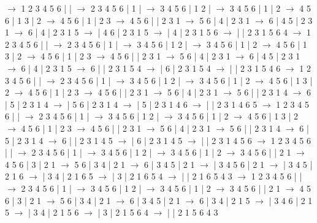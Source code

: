 \documentclass{article}
\begin{document}
\newline
 $\rightarrow$ 1 2 3 4 5 6 |  |  $\rightarrow$ 2 3 4 5 6 | 1 |  $\rightarrow$ 3 4 5 6 | 1 2 |  $\rightarrow$ 3 4 5 6 | 1 | 2 $\rightarrow$ 4 5 6 | 1 3 | 2 $\rightarrow$ 4 5 6 | 1 | 2 3 $\rightarrow$ 4 5 6 |  | 2 3 1 $\rightarrow$ 5 6 | 4 | 2 3 1 $\rightarrow$ 6 | 4 5 | 2 3 1 $\rightarrow$ 6 | 4 | 2 3 1 5 $\rightarrow$  | 4 6 | 2 3 1 5 $\rightarrow$  | 4 | 2 3 1 5 6 $\rightarrow$  |  | 2 3 1 5 6 4
\newline
 $\rightarrow$ 1 2 3 4 5 6 |  |  $\rightarrow$ 2 3 4 5 6 | 1 |  $\rightarrow$ 3 4 5 6 | 1 2 |  $\rightarrow$ 3 4 5 6 | 1 | 2 $\rightarrow$ 4 5 6 | 1 3 | 2 $\rightarrow$ 4 5 6 | 1 | 2 3 $\rightarrow$ 4 5 6 |  | 2 3 1 $\rightarrow$ 5 6 | 4 | 2 3 1 $\rightarrow$ 6 | 4 5 | 2 3 1 $\rightarrow$ 6 | 4 | 2 3 1 5 $\rightarrow$ 6 |  | 2 3 1 5 4 $\rightarrow$  | 6 | 2 3 1 5 4 $\rightarrow$  |  | 2 3 1 5 4 6
\newline
 $\rightarrow$ 1 2 3 4 5 6 |  |  $\rightarrow$ 2 3 4 5 6 | 1 |  $\rightarrow$ 3 4 5 6 | 1 2 |  $\rightarrow$ 3 4 5 6 | 1 | 2 $\rightarrow$ 4 5 6 | 1 3 | 2 $\rightarrow$ 4 5 6 | 1 | 2 3 $\rightarrow$ 4 5 6 |  | 2 3 1 $\rightarrow$ 5 6 | 4 | 2 3 1 $\rightarrow$ 5 6 |  | 2 3 1 4 $\rightarrow$ 6 | 5 | 2 3 1 4 $\rightarrow$  | 5 6 | 2 3 1 4 $\rightarrow$  | 5 | 2 3 1 4 6 $\rightarrow$  |  | 2 3 1 4 6 5
\newline
 $\rightarrow$ 1 2 3 4 5 6 |  |  $\rightarrow$ 2 3 4 5 6 | 1 |  $\rightarrow$ 3 4 5 6 | 1 2 |  $\rightarrow$ 3 4 5 6 | 1 | 2 $\rightarrow$ 4 5 6 | 1 3 | 2 $\rightarrow$ 4 5 6 | 1 | 2 3 $\rightarrow$ 4 5 6 |  | 2 3 1 $\rightarrow$ 5 6 | 4 | 2 3 1 $\rightarrow$ 5 6 |  | 2 3 1 4 $\rightarrow$ 6 | 5 | 2 3 1 4 $\rightarrow$ 6 |  | 2 3 1 4 5 $\rightarrow$  | 6 | 2 3 1 4 5 $\rightarrow$  |  | 2 3 1 4 5 6
\newline
 $\rightarrow$ 1 2 3 4 5 6 |  |  $\rightarrow$ 2 3 4 5 6 | 1 |  $\rightarrow$ 3 4 5 6 | 1 2 |  $\rightarrow$ 3 4 5 6 | 1 | 2 $\rightarrow$ 3 4 5 6 |  | 2 1 $\rightarrow$ 4 5 6 | 3 | 2 1 $\rightarrow$ 5 6 | 3 4 | 2 1 $\rightarrow$ 6 | 3 4 5 | 2 1 $\rightarrow$  | 3 4 5 6 | 2 1 $\rightarrow$  | 3 4 5 | 2 1 6 $\rightarrow$  | 3 4 | 2 1 6 5 $\rightarrow$  | 3 | 2 1 6 5 4 $\rightarrow$  |  | 2 1 6 5 4 3
\newline
 $\rightarrow$ 1 2 3 4 5 6 |  |  $\rightarrow$ 2 3 4 5 6 | 1 |  $\rightarrow$ 3 4 5 6 | 1 2 |  $\rightarrow$ 3 4 5 6 | 1 | 2 $\rightarrow$ 3 4 5 6 |  | 2 1 $\rightarrow$ 4 5 6 | 3 | 2 1 $\rightarrow$ 5 6 | 3 4 | 2 1 $\rightarrow$ 6 | 3 4 5 | 2 1 $\rightarrow$ 6 | 3 4 | 2 1 5 $\rightarrow$  | 3 4 6 | 2 1 5 $\rightarrow$  | 3 4 | 2 1 5 6 $\rightarrow$  | 3 | 2 1 5 6 4 $\rightarrow$  |  | 2 1 5 6 4 3
\end{document}
